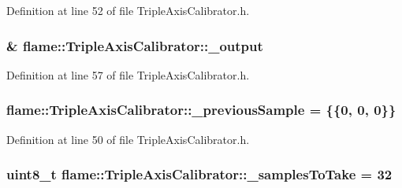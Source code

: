 Definition at line 52 of file Triple\-Axis\-Calibrator.\-h.

\hypertarget{classflame_1_1_triple_axis_calibrator_a6fccd0307b71a7dbfa1c4fd0adcaa188}{
\subsubsection[{\-\_\-output}]{\& flame\-::\-Triple\-Axis\-Calibrator\-::\-\_\-output\hspace{0.3cm}{\ttfamily [protected]}}}\label{classflame_1_1_triple_axis_calibrator_a6fccd0307b71a7dbfa1c4fd0adcaa188}


Definition at line 57 of file Triple\-Axis\-Calibrator.\-h.

\hypertarget{classflame_1_1_triple_axis_calibrator_a11ec83028a6841ec9d89f61e8f72620e}{
\subsubsection[{\-\_\-previous\-Sample}]{ flame\-::\-Triple\-Axis\-Calibrator\-::\-\_\-previous\-Sample = \{\{0, 0, 0\}\}\hspace{0.3cm}{\ttfamily [protected]}}}\label{classflame_1_1_triple_axis_calibrator_a11ec83028a6841ec9d89f61e8f72620e}


Definition at line 50 of file Triple\-Axis\-Calibrator.\-h.

\hypertarget{classflame_1_1_triple_axis_calibrator_a996c1d5e43bd37fba52d8e9ff4b0349c}{
\subsubsection[{\-\_\-samples\-To\-Take}]{\setlength{\rightskip}{0pt plus 5cm}uint8\-\_\-t flame\-::\-Triple\-Axis\-Calibrator\-::\-\_\-samples\-To\-Take = 32\hspace{0.3cm}{\ttfamily [protected]}}}\label{classflame_1_1_triple_axis_calibrator_a996c1d5e43bd37fba52d8e9ff4b0349c}


